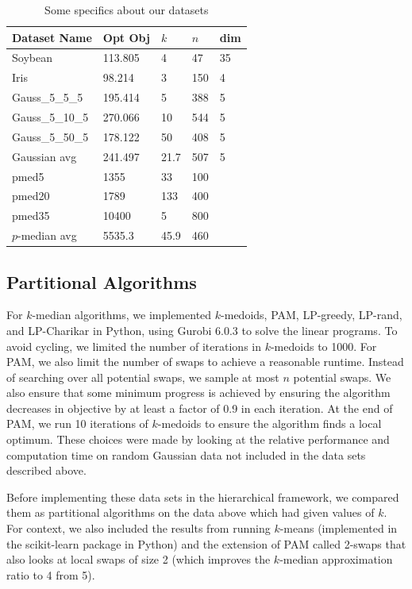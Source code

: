 \documentclass[conference, 10pt, final]{IEEEtran}
\begin{document}
\begin{table}[!t]
\caption{Some specifics about our datasets}
\label{table_specifics}
\centering
\begin{tabular}{ | l | l | l | l | l | }
\hline
 Dataset Name & Opt Obj & $k$ & $n$ & dim \\ \hline
Soybean & 113.805 & 4 & 47 & 35 \\ 
Iris & 98.214 & 3 & 150 & 4 \\ 
Gauss\_5\_5\_5 & 195.414 & 5 & 388 & 5 \\ 
Gauss\_5\_10\_5 & 270.066 & 10 & 544 & 5 \\ 
Gauss\_5\_50\_5 & 178.122 & 50 & 408 & 5 \\ 
Gaussian avg & 241.497 & 21.7 & 507 & 5 \\ 
pmed5 & 1355 & 33 & 100 & \  \\ 
pmed20 & 1789 & 133 & 400 & \  \\ 
pmed35 & 10400 & 5 & 800 & \  \\ 
$p$-median avg & 5535.3 & 45.9 & 460 & \  \\ \hline
 \end{tabular}
\end{table}

\subsection{Partitional Algorithms}
For $k$-median algorithms, we implemented $k$-medoids, PAM, LP-greedy, LP-rand, and LP-Charikar in Python, using Gurobi 6.0.3 to solve the linear programs. 
To avoid cycling, we limited the number of iterations in $k$-medoids to 1000. For PAM, we also limit the number of swaps to achieve a reasonable runtime. Instead of searching over all potential swaps, we sample at most $n$ potential swaps. We also ensure that some minimum progress is achieved by ensuring the algorithm decreases in objective by at least a factor of 0.9 in each iteration. At the end of PAM, we run 10 iterations of $k$-medoids to ensure the algorithm finds a local optimum. These choices were made by looking at the relative performance and computation time on random Gaussian data not included in the data sets described above.

Before implementing these data sets in the hierarchical framework, we compared them as partitional algorithms on the data above which had given values of $k$. For context, we also included the results from running $k$-means (implemented in the scikit-learn package in Python) and the extension of PAM called 2-swaps that also looks at local swaps of size 2 (which improves the $k$-median approximation ratio to 4 from 5). 
\end{document}
